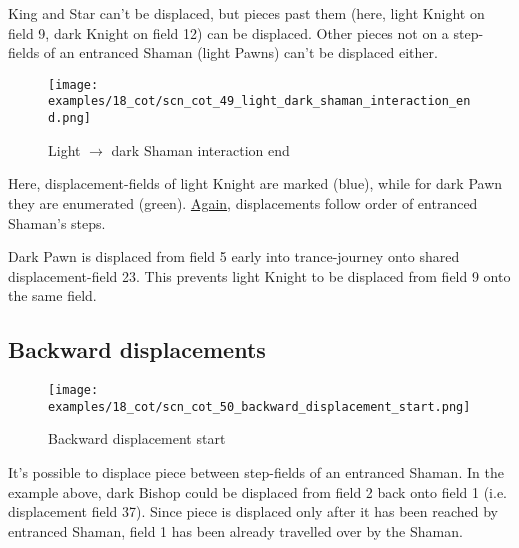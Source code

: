King and Star can't be displaced, but pieces past them (here, light Knight on field 9,
dark Knight on field 12) can be displaced. Other pieces not on a step-fields of an
entranced Shaman (light Pawns) can't be displaced either.

\clearpage %

\noindent
\begin{figure}[!h]
\texttt{[image: examples/18\_cot/scn\_cot\_49\_light\_dark\_shaman\_interaction\_end.png]}
\caption{Light $\rightarrow$ dark Shaman interaction end}
\label{fig:scn_cot_49_light_dark_shaman_interaction_end}
\end{figure}

Here, displacement-fields of light Knight are marked (blue), while for dark Pawn
they are enumerated (green).
\hyperref[fig:scn_cot_41_light_light_shaman_interaction_end]{Again}, displacements
follow order of entranced Shaman's steps.

Dark Pawn is displaced from field 5 early into trance-journey onto shared
displacement-field 23. This prevents light Knight to be displaced from field 9
onto the same field.

\clearpage %

\subsection*{Backward displacements}
\label{sec:Conquest of Tlalocan/Trance-journey/Backward displacements}

\noindent
\begin{figure}[!h]
\vspace{-1.0\baselineskip}
\texttt{[image: examples/18\_cot/scn\_cot\_50\_backward\_displacement\_start.png]}
\caption{Backward displacement start}
\label{fig:scn_cot_50_backward_displacement_start}
\end{figure}

It's possible to displace piece between step-fields of an entranced Shaman. In the
example above, dark Bishop could be displaced from field 2 back onto field 1 (i.e.
displacement field 37). Since piece is displaced only after it has been reached by
entranced Shaman, field 1 has been already travelled over by the Shaman.

